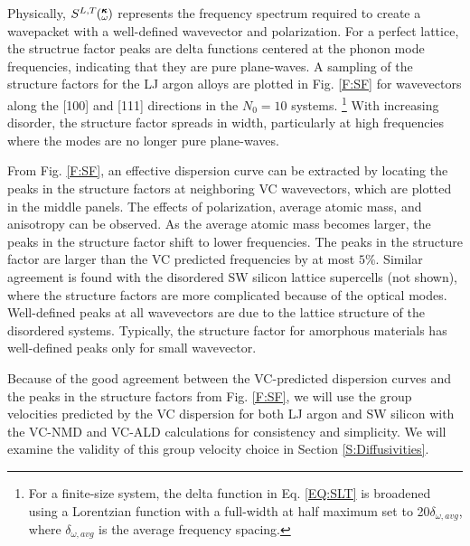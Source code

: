 \documentclass[aps,prb,onecolumn,preprint,superscriptaddress,amsmath,amssymb,floatfix]{revtex4}
\newcommand{\kw}{\mspace{-4.0mu}\left(\mspace{-8.0mu}
\begin{smallmatrix}&\pmb{\kappa} \\&\omega\end{smallmatrix}
\mspace{-3.0mu}\right)}
\begin{document}
Physically, $S^{L,T}\kw$ represents  
the frequency spectrum required to create a wavepacket with a 
well-defined wavevector and polarization.
\cite{allen_diffusons_1999,feldman_numerical_1999,green_density_2011} 
For a perfect lattice, the 
structrue factor peaks are delta functions centered at the phonon mode 
frequencies, indicating that they are pure plane-waves. 
A sampling of the structure factors for the LJ argon alloys 
are plotted in Fig. \ref{F:SF} for wavevectors along the [100] and [111] 
directions in the $N_0=10$ systems.
\footnote[1]{For a finite-size system, the 
delta function in Eq. \eqref{EQ:SLT} is broadened using a Lorentzian 
function with a full-width at half maximum set to 
20$\delta_{\omega,avg}$, where $\delta_{\omega,avg}$ 
is the average frequency spacing.\cite{feldman_numerical_1999} }
With increasing disorder, the structure factor spreads in width,  
particularly at high frequencies where the modes are no longer 
pure plane-waves.  

From Fig. \ref{F:SF}, 
an effective dispersion curve can be extracted by 
locating the peaks in the 
structure factors at neighboring VC wavevectors, which are plotted 
in the middle panels. The 
effects of polarization, average atomic mass, and 
anisotropy can be observed. 
As the average atomic mass becomes larger,  
the peaks in the structure factor shift to lower frequencies. 
The peaks in the structure factor are larger 
than the VC predicted frequencies by 
at most $5\%$. Similar agreement is found with the disordered 
SW silicon lattice supercells (not shown), 
where the structure factors are 
more complicated because of the optical modes. 
Well-defined peaks 
at all wavevectors are due to the 
lattice structure of the disordered systems. 
Typically, the structure factor for amorphous materials has well-defined 
peaks only for small wavevector.
\cite{allen_diffusons_1999,feldman_numerical_1999}   

Because of the good agreement between the VC-predicted dispersion 
curves and 
the peaks in the structure factors from Fig. \ref{F:SF},  
we will use the group velocities predicted by the VC dispersion for both
LJ argon and SW silicon 
with the VC-NMD and VC-ALD calculations for 
consistency and simplicity. We will examine 
the validity of this group velocity choice in 
Section \ref{S:Diffusivities}. 
\end{document}
